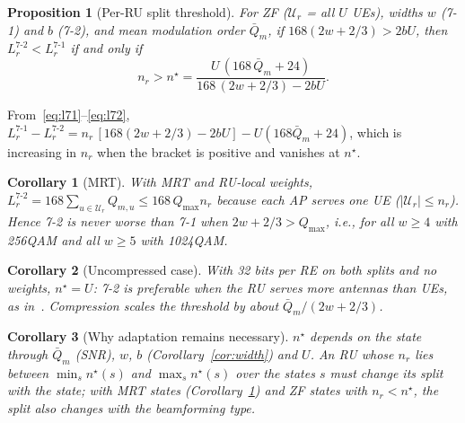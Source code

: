\documentclass[10pt, final, journal, letterpaper, twocolumn]{IEEEtran}
\newtheorem{proposition}{Proposition}
\newtheorem{corollary}{Corollary}
\begin{document}
\begin{proposition}[Per-RU split threshold]
\label{prop:threshold}
For ZF ($\mathcal{U}_r$ = all $U$ UEs), widths $w$ (7-1) and $b$ (7-2), and mean modulation order $\bar Q_m$, if $168(2w+2/3)>2bU$, then $L^{7\text{-}2}_r<L^{7\text{-}1}_r$ if and only if
\begin{equation}
  n_r > n^\star = \frac{U\,(168\,\bar Q_m + 24)}{168\,(2w+2/3) - 2bU}.
  \label{eq:nstar}
\end{equation}
\end{proposition}
\begin{IEEEproof}
From~\eqref{eq:l71}--\eqref{eq:l72}, $L^{7\text{-}1}_r-L^{7\text{-}2}_r = n_r\,[168(2w+2/3)-2bU] - U(168\bar Q_m+24)$, which is increasing in $n_r$ when the bracket is positive and vanishes at $n^\star$.
\end{IEEEproof}

\begin{corollary}[MRT]
\label{cor:mrt}
With MRT and RU-local weights, $L^{7\text{-}2}_r = 168\sum_{u\in\mathcal{U}_r}Q_{m,u}\le 168\,Q_{\max} n_r$ because each AP serves one UE ($|\mathcal{U}_r|\le n_r$). Hence 7-2 is never worse than 7-1 when $2w+2/3>Q_{\max}$, i.e., for all $w\ge4$ with 256QAM and all $w\ge5$ with 1024QAM.
\end{corollary}

\begin{corollary}[Uncompressed case]
With 32 bits per RE on both splits and no weights, $n^\star = U$: 7-2 is preferable when the RU serves more antennas than UEs, as in~\cite{girycki2024eucnc}. Compression scales the threshold by about $\bar Q_m/(2w+2/3)$.
\end{corollary}

\begin{corollary}[Why adaptation remains necessary]
\label{cor:dynamic}
$n^\star$ depends on the state through $\bar Q_m$ (SNR), $w$, $b$ (Corollary~\ref{cor:width}) and $U$. An RU whose $n_r$ lies between $\min_s n^\star(s)$ and $\max_s n^\star(s)$ over the states $s$ must change its split with the state; with MRT states (Corollary~\ref{cor:mrt}) and ZF states with $n_r<n^\star$, the split also changes with the beamforming type.
\end{corollary}
\end{document}
